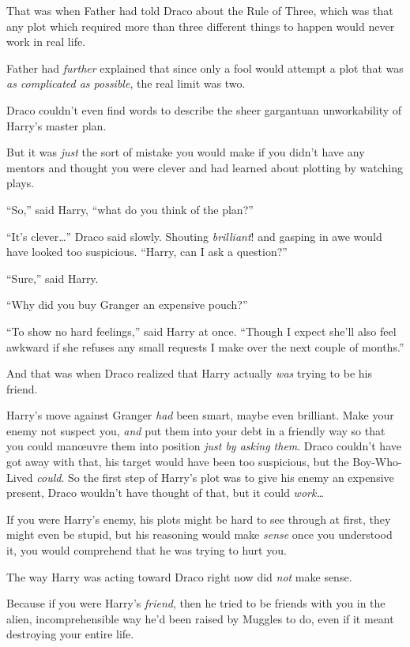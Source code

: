 That was when Father had told Draco about the Rule of Three, which was that any plot which required more than three different things to happen would never work in real life.

Father had \emph{further} explained that since only a fool would attempt a plot that was \emph{as complicated as possible}, the real limit was two.

Draco couldn’t even find words to describe the sheer gargantuan unworkability of Harry’s master plan.

But it was \emph{just} the sort of mistake you would make if you didn’t have any mentors and thought you were clever and had learned about plotting by watching plays.

“So,” said Harry, “what do you think of the plan?”

“It’s clever…” Draco said slowly. Shouting \emph{brilliant}! and gasping in awe would have looked too suspicious. “Harry, can I ask a question?”

“Sure,” said Harry.

“Why did you buy Granger an expensive pouch?”

“To show no hard feelings,” said Harry at once. “Though I expect she’ll also feel awkward if she refuses any small requests I make over the next couple of months.”

And that was when Draco realized that Harry actually \emph{was} trying to be his friend.

Harry’s move against Granger \emph{had} been smart, maybe even brilliant. Make your enemy not suspect you, \emph{and} put them into your debt in a friendly way so that you could manœuvre them into position \emph{just by asking them}. Draco couldn’t have got away with that, his target would have been too suspicious, but the Boy-Who-Lived \emph{could}. So the first step of Harry’s plot was to give his enemy an expensive present, Draco wouldn’t have thought of that, but it could \emph{work…}

If you were Harry’s enemy, his plots might be hard to see through at first, they might even be stupid, but his reasoning would make \emph{sense} once you understood it, you would comprehend that he was trying to hurt you.

The way Harry was acting toward Draco right now did \emph{not} make sense.

Because if you were Harry’s \emph{friend}, then he tried to be friends with you in the alien, incomprehensible way he’d been raised by Muggles to do, even if it meant destroying your entire life.

